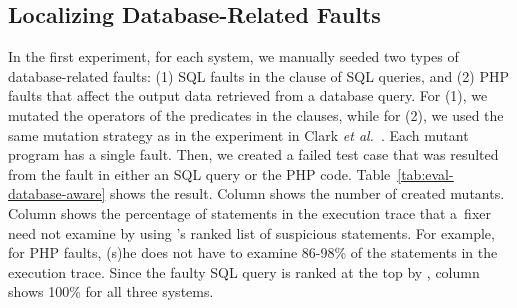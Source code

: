\subsection{Localizing Database-Related Faults}



In the first experiment, for each system, we manually 
seeded two types of database-related faults: (1) SQL faults in the
 clause of SQL queries, and (2) PHP faults that affect
the output data
retrieved from a database query. For (1), we mutated the operators of
the predicates in the  clauses, while for (2), we used
the same mutation strategy as in the experiment in Clark {\em et
al.}~\cite{ga-ase11}. Each mutant program has a single fault. Then, we
created a failed test case that was resulted from the fault in either
an SQL query or the PHP code. Table~\ref{tab:eval-database-aware}
shows the result. Column
 shows the number of created mutants.
Column  shows the percentage of statements in
the execution trace that a~fixer need not examine by using
\tool{}'s ranked list of suspicious statements. For example, for PHP
faults, (s)he does not have to examine 86-98\% of the statements in
the execution trace. Since the faulty SQL query is ranked at the top
by \tool{}, column  shows 100\% for all three
systems.

